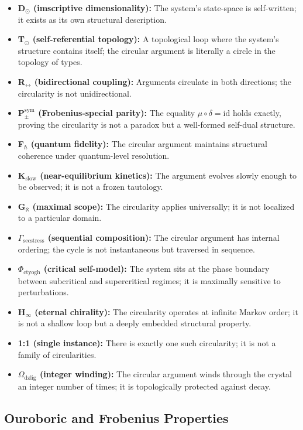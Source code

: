 \documentclass[12pt,a4paper]{article}
\begin{document}
\begin{itemize}
    \item \textbf{D$_{\odot}$ (imscriptive dimensionality):} The system's state-space is self-written; it exists as its own structural description.
    \item \textbf{T$_{\odot}$ (self-referential topology):} A topological loop where the system's structure contains itself; the circular argument is literally a circle in the topology of types.
    \item \textbf{R$_{\leftrightarrow}$ (bidirectional coupling):} Arguments circulate in both directions; the circularity is not unidirectional.
    \item \textbf{P$_{\pm}^{\text{sym}}$ (Frobenius-special parity):} The equality $\mu \circ \delta = \text{id}$ holds exactly, proving the circularity is not a paradox but a well-formed self-dual structure.
    \item \textbf{F$_{\hbar}$ (quantum fidelity):} The circular argument maintains structural coherence under quantum-level resolution.
    \item \textbf{K$_\text{slow}$ (near-equilibrium kinetics):} The argument evolves slowly enough to be observed; it is not a frozen tautology.
    \item \textbf{G$_{\aleph}$ (maximal scope):} The circularity applies universally; it is not localized to a particular domain.
    \item \textbf{$\Gamma_{\text{secstress}}$ (sequential composition):} The circular argument has internal ordering; the cycle is not instantaneous but traversed in sequence.
    \item \textbf{$\Phi_{\text{ctyogh}}$ (critical self-model):} The system sits at the phase boundary between subcritical and supercritical regimes; it is maximally sensitive to perturbations.
    \item \textbf{H$_{\infty}$ (eternal chirality):} The circularity operates at infinite Markov order; it is not a shallow loop but a deeply embedded structural property.
    \item \textbf{1:1 (single instance):} There is exactly one such circularity; it is not a family of circularities.
    \item \textbf{$\Omega_{\text{dzlig}}$ (integer winding):} The circular argument winds through the crystal an integer number of times; it is topologically protected against decay.
\end{itemize}

\subsection{Ouroboric and Frobenius Properties}
\end{document}
